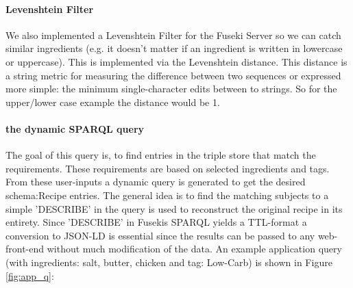 \documentclass{article}
\begin{document}
\paragraph{Levenshtein Filter}
We also implemented a Levenshtein Filter for the Fuseki Server so we can catch similar ingredients (e.g. it doesn't matter if an ingredient is written in lowercase or uppercase). This is implemented via the Levenshtein distance. This distance is a string metric for measuring the difference between two sequences or expressed more simple: the minimum single-character edits between to strings. So for the upper/lower case example the distance would be 1.

\paragraph{the dynamic SPARQL query}
The goal of this query is, to find entries in the triple store that match the requirements. These requirements are based on selected ingredients and tags. From these user-inputs a dynamic query is generated to get the desired schema:Recipe entries. The general idea is to find the matching subjects to a simple 'DESCRIBE' in the query is used to reconstruct the original recipe in its entirety. Since 'DESCRIBE' in Fusekis SPARQL yields a TTL-format a conversion to JSON-LD is essential since the results can be passed to any web-front-end without much modification of the data. An example application query (with ingredients: salt, butter, chicken and tag: Low-Carb) is shown in Figure \ref{fig:app_q}:
\end{document}
